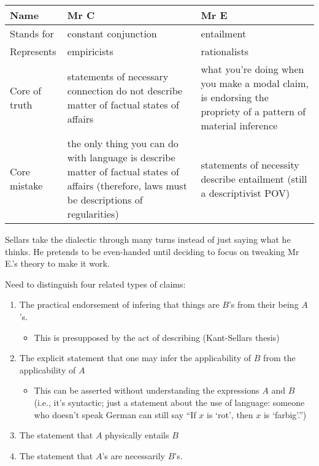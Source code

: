 \begin{table}[]
\begin{tabular}{|l|l|l|}
\hline
Name & Mr C &  Mr E\\ \hline
Stands for & constant conjunction & entailment \\ \hline
Represents & empiricists &  rationalists\\ \hline
Core of truth &  statements of necessary connection do not describe matter of factual states of affairs & what you're doing when you make a modal claim, is endorsing the propriety of a pattern of material inference \\ \hline
Core mistake & the only thing you can do with language is describe matter of factual states of affairs (therefore, laws must be descriptions of regularities) & statements of necessity describe entailment (still a descriptivist POV) \\ \hline
\end{tabular}
\caption{}
\label{tab:mrdebate}
\end{table}

Sellars take the dialectic through many turns instead of just saying what he thinks. He pretends to be even-handed until deciding to focus on tweaking Mr E.'s theory to make it work.

Need to distinguish four related types of claims:
\begin{enumerate}
\item The practical endorsement of infering that things are $B$'s from their being $A$'s. \begin{itemize}
\item This is presupposed by the act of describing (Kant-Sellars thesis)
\end{itemize}
\item The explicit statement that one may infer the applicability of $B$ from the applicability of $A$ \begin{itemize}
\item This can be asserted without understanding the expressions $A$ and $B$ (i.e., it's syntactic; just a statement about the use of language: someone who doesn't speak German can still say ``If $x$ is `rot', then $x$ is `farbig'.'')
\end{itemize}
\item The statement that $A$ physically entails $B$
\item The statement that $A$'s are necessarily $B$'s.
\end{enumerate}

